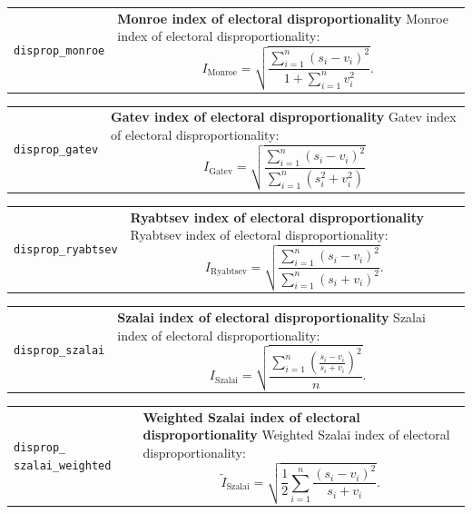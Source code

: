\documentclass[
]{scrartcl}
\begin{document}
\begin{longtable}{p{3.2cm}| p{11cm}}
\texttt{disprop\_monroe} &\textbf{Monroe index of electoral disproportionality}\newline 
Monroe index of electoral disproportionality:
           \begin{equation}I_{\text{Monroe}} = \sqrt{\frac{\sum_{i=1}^{n}\left(s_i - v_i\right)^2}{1 + \sum_{i=1}^{n}v_i^2}}.\end{equation}
\end{longtable}

\begin{longtable}{p{3.2cm}| p{11cm}}
\texttt{disprop\_gatev} &\textbf{Gatev index of electoral disproportionality}\newline 
Gatev index of electoral disproportionality:
           \begin{equation}I_{\text{Gatev}} = \sqrt{\frac{\sum_{i=1}^{n}\left(s_i - v_i\right)^2}{\sum_{i=1}^{n}\left(s_i^2 + v_i^2\right)}}\end{equation}
\end{longtable}

\begin{longtable}{p{3.2cm}| p{11cm}}
\texttt{disprop\_ryabtsev} &\textbf{Ryabtsev  index of electoral disproportionality}\newline 
Ryabtsev  index of electoral disproportionality:
           \begin{equation}I_{\text{Ryabtsev}} = \sqrt{\frac{\sum_{i=1}^{n}\left(s_i - v_i\right)^2}{\sum_{i=1}^{n}\left(s_i + v_i\right)^2}}.\end{equation}
\end{longtable}

\begin{longtable}{p{3.2cm}| p{11cm}}
\texttt{disprop\_szalai} &\textbf{Szalai index of electoral disproportionality}\newline 
Szalai index of electoral disproportionality:
           \begin{equation}I_{\text{Szalai}} = \sqrt{\frac{\sum_{i=1}^{n}\left(\frac{s_i-v_i}{s_i+v_i}\right)^2}{n}}.\end{equation}
\end{longtable}

\begin{longtable}{p{3.2cm}| p{11cm}}
\texttt{disprop\_
szalai\_weighted} &\textbf{Weighted Szalai index of electoral disproportionality}\newline 
Weighted Szalai index of electoral disproportionality:
           \begin{equation}\tilde{I}_{\text{Szalai}} = \sqrt{\frac{1}{2}\sum_{i=1}^{n}\frac{\left(s_i-v_i\right)^2}{s_i+v_i}}.\end{equation}
\end{longtable}
\end{document}
